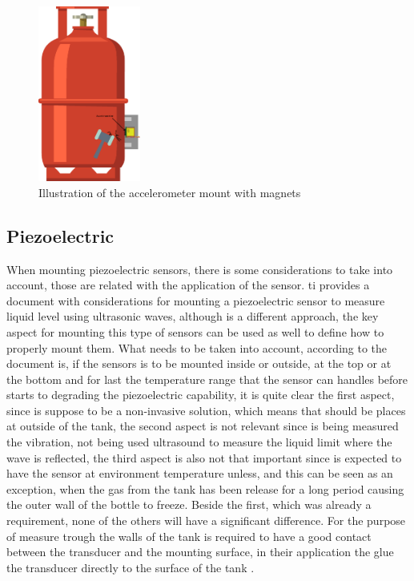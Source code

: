\begin{figure}[]
    \centering
    \includegraphics[width=0.3\textwidth]{Chapters/4CHP/Figures/AccMagnets.eps}
    \caption{Illustration of the accelerometer mount with magnets}
    \label{fig:mounMagnet}
\end{figure}
%

\subsection{Piezoelectric}
When mounting piezoelectric sensors, there is some considerations to take into account, those are related with the application of the sensor. \acrshort{ti} provides a document with considerations for mounting a piezoelectric sensor to measure liquid level using ultrasonic waves, although is a different approach, the key aspect for mounting this type of sensors can be used as well to define how to properly mount them. What needs to be taken into account, according to the document is, if the sensors is to be mounted inside or outside, at the top or at the bottom and for last the temperature range that the sensor can handles before starts to degrading the piezoelectric capability, it is quite clear the first aspect, since is suppose to be a non-invasive solution, which means that should be places at outside of the tank, the second aspect is not relevant since is being measured the vibration, not being used ultrasound to measure the liquid limit where the wave is reflected, the third aspect is also not that important since is expected to have the sensor at environment temperature unless, and this can be seen as an exception, when the gas from the tank has been release for a long period causing the outer wall of the bottle to freeze. Beside the first, which was already a requirement, none of the others will have a significant difference. For the purpose of measure trough the walls of the tank is required to have a good contact between the transducer and the mounting surface, in their application the glue the transducer directly to the surface of the tank \cite{minasiHowSelectMount2015}.

